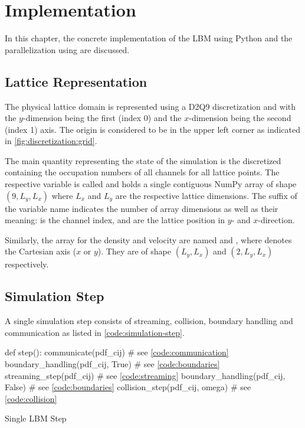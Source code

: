 \section{Implementation}

In this chapter, the concrete implementation of the \gls{LBM} using Python and the parallelization using  are discussed.

\subsection{Lattice Representation}

The physical lattice domain is represented using a D2Q9 discretization and with the $y$-dimension being the first (index 0) and the $x$-dimension being the second (index 1) axis. The origin is considered to be in the upper left corner as indicated in \cref{fig:discretization:grid}.

The main quantity representing the state of the simulation is the discretized  containing the occupation numbers of all channels for all lattice points. The respective variable is called  and holds a single contiguous NumPy array of shape $(9, L_y, L_x)$ where $L_x$ and $L_y$ are the respective lattice dimensions. The suffix of the variable name indicates the number of array dimensions as well as their meaning:  is the channel index,  and  are the lattice position in $y$- and $x$-direction.

Similarly, the array for the density and velocity are named  and , where  denotes the Cartesian axis ($x$ or $y$). They are of shape $(L_y,L_x)$ and $(2,L_y,L_x)$ respectively.

\subsection{Simulation Step}

A single simulation step consists of streaming, collision, boundary handling and communication as listed in \cref{code:simulation-step}.

\begin{listing}[ht!]
    \begin{pycode}
        def step():
            communicate(pdf_cij)                # see \cref{code:communication}
            boundary_handling(pdf_cij, True)    # see \cref{code:boundaries}
            streaming_step(pdf_cij)             # see \cref{code:streaming}
            boundary_handling(pdf_cij, False)   # see \cref{code:boundaries}
            collision_step(pdf_cij, omega)      # see \cref{code:collision}
    \end{pycode}
    \caption{Single \gls{LBM} Step}
    \label{code:simulation-step}
\end{listing}

